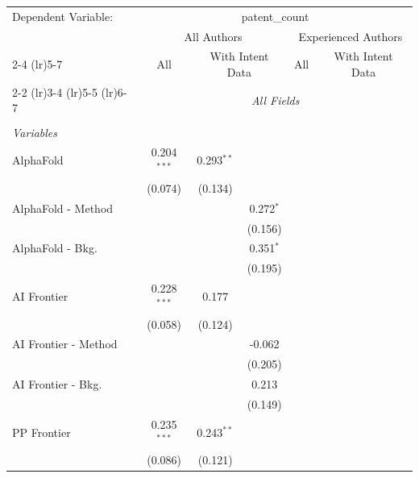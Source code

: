\begingroup
\centering
\begin{tabular}{lcccccc}
   \tabularnewline \midrule \midrule
   Dependent Variable: & \multicolumn{6}{c}{patent\_count}\\
 & \multicolumn{3}{c}{All Authors} & \multicolumn{3}{c}{Experienced Authors} \\
\cmidrule(lr){2-4} \cmidrule(lr){5-7}
 & \multicolumn{1}{c}{All} & \multicolumn{2}{c}{With Intent Data} & \multicolumn{1}{c}{All} & \multicolumn{2}{c}{With Intent Data} \\
\cmidrule(lr){2-2} \cmidrule(lr){3-4} \cmidrule(lr){5-5} \cmidrule(lr){6-7}
 & \multicolumn{6}{c}{\textit{All Fields}} \\ \\
   \emph{Variables}\\
   AlphaFold            & 0.204$^{***}$ & 0.293$^{**}$ &             &       &       &   \\   
                        & (0.074)       & (0.134)      &             &       &       &   \\   
   AlphaFold - Method   &               &              & 0.272$^{*}$ &       &       &   \\   
                        &               &              & (0.156)     &       &       &   \\   
   AlphaFold - Bkg.     &               &              & 0.351$^{*}$ &       &       &   \\   
                        &               &              & (0.195)     &       &       &   \\   
   AI Frontier          & 0.228$^{***}$ & 0.177        &             &       &       &   \\   
                        & (0.058)       & (0.124)      &             &       &       &   \\   
   AI Frontier - Method &               &              & -0.062      &       &       &   \\   
                        &               &              & (0.205)     &       &       &   \\   
   AI Frontier - Bkg.   &               &              & 0.213       &       &       &   \\   
                        &               &              & (0.149)     &       &       &   \\   
   PP Frontier          & 0.235$^{***}$ & 0.243$^{**}$ &             &       &       &   \\   
                        & (0.086)       & (0.121)      &             &       &       &   \\   

\end{tabular}
